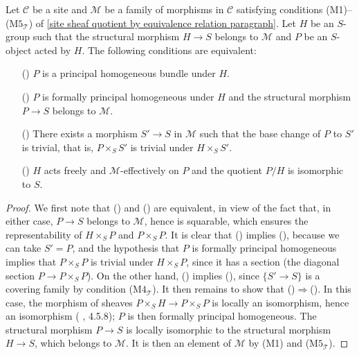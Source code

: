 \begin{proposition}\label{site formally principal homogeneous under M-group iff}
Let $\mathcal{C}$ be a site and $\mathcal{M}$ be a family of morphisms in $\mathcal{C}$ satisfying conditions (M1)--($\text{M}5_\mathcal{T}$) of \ref{site sheaf quotient by equivalence relation paragraph}. Let $H$ be an $S$-group such that the structural morphism $H\to S$ belongs to $\mathcal{M}$ and $P$ be an $S$-object acted by $H$. The following conditions are equivalent:
\begin{enumerate}
    \item[(\rmnum{1})] $P$ is a principal homogeneous bundle under $H$.
    \item[(\rmnum{2})] $P$ is formally principal homogeneous under $H$ and the structural morphism $P\to S$ belongs to $\mathcal{M}$.
    \item[(\rmnum{3})] There exists a morphism $S'\to S$ in $\mathcal{M}$ such that the base change of $P$ to $S'$ is trivial, that is, $P\times_SS'$ is trivial under $H\times_SS'$.
    \item[(\rmnum{4})] $H$ acts freely and $\mathcal{M}$-effectively on $P$ and the quotient $P/H$ is isomorphic to $S$.
\end{enumerate}
\end{proposition}
\begin{proof}
We first note that () and () are equivalent, in view of the fact that, in either case, $P\to S$ belongs to $\mathcal{M}$, hence is squarable, which ensures the representability of $H\times_SP$ and $P\times_SP$. It is clear that () implies (), because we can take $S'=P$, and the hypothesis that $P$ is formally principal homogeneous implies that $P\times_SP$ is trivial under $H\times_SP$, since it has a section (the diagonal section $P\to P\times_SP$). On the other hand, () implies (), since $\{S'\to S\}$ is a covering family by condition ($\text{M4}_\mathcal{T}$). It then remains to show that ()$\Rightarrow$(). In this case, the morphism of sheaves $P\times_SH\to P\times_SP$ is locally an isomorphism, hence an isomorphism (\cite{SGA3} , 4.5.8); $P$ is then formally principal homogeneous. The structural morphism $P\to S$ is locally isomorphic to the structural morphism $H\to S$, which belongs to $\mathcal{M}$. It is then an element of $\mathcal{M}$ by (M1) and ($\text{M5}_\mathcal{T}$).
\end{proof}

